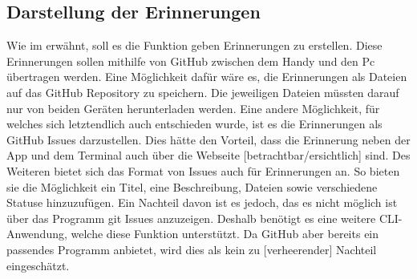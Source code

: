 \subsection{Darstellung der Erinnerungen}\label{section:tech:sub:darstellung_der_erinnerungen}%
Wie im  erwähnt, soll es die Funktion geben Erinnerungen zu erstellen. Diese Erinnerungen sollen mithilfe von GitHub zwischen dem Handy und den Pc übertragen werden.\newline%
Eine Möglichkeit dafür wäre es, die Erinnerungen als Dateien auf das GitHub Repository zu speichern. Die jeweiligen Dateien müssten darauf nur von beiden Geräten herunterladen werden.\newline%
Eine andere Möglichkeit, für welches sich letztendlich auch entschieden wurde, ist es die Erinnerungen als GitHub Issues darzustellen. Dies hätte den Vorteil, dass die Erinnerung neben der App und dem Terminal auch über die Webseite [betrachtbar/ersichtlich] sind. Des Weiteren bietet sich das Format von Issues auch für Erinnerungen an. So bieten sie die Möglichkeit ein Titel, eine Beschreibung, Dateien sowie verschiedene Statuse hinzuzufügen.\newline%
Ein Nachteil davon ist es jedoch, das es nicht möglich ist über das Programm git Issues anzuzeigen. Deshalb benötigt es eine weitere CLI-Anwendung, welche diese Funktion unterstützt. Da GitHub aber bereits ein passendes Programm anbietet\cite{tech_github-cli}, wird dies als kein zu [verheerender] Nachteil eingeschätzt.